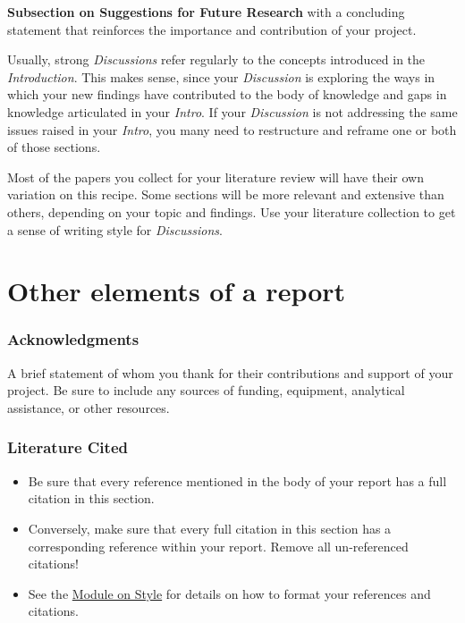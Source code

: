 \documentclass[
]{book}
\begin{document}
\textbf{Subsection on Suggestions for Future Research} with a concluding statement that reinforces the importance and contribution of your project.

Usually, strong \emph{Discussions} refer regularly to the concepts introduced in the \emph{Introduction}. This makes sense, since your \emph{Discussion} is exploring the ways in which your new findings have contributed to the body of knowledge and gaps in knowledge articulated in your \emph{Intro}. If your \emph{Discussion} is not addressing the same issues raised in your \emph{Intro}, you many need to restructure and reframe one or both of those sections.

Most of the papers you collect for your literature review will have their own variation on this recipe. Some sections will be more relevant and extensive than others, depending on your topic and findings. Use your literature collection to get a sense of writing style for \emph{Discussions}.

\hypertarget{other-elements-of-a-report}{%
\section*{Other elements of a report}\label{other-elements-of-a-report}}

\hypertarget{acknowledgments}{%
\subsubsection*{Acknowledgments}\label{acknowledgments}}

A brief statement of whom you thank for their contributions and support of your project. Be sure to include any sources of funding, equipment, analytical assistance, or other resources.

\hypertarget{literature-cited}{%
\subsubsection*{Literature Cited}\label{literature-cited}}

\begin{itemize}
\item
  Be sure that every reference mentioned in the body of your report has a full citation in this section.
\item
  Conversely, make sure that every full citation in this section has a corresponding reference within your report. Remove all un-referenced citations!
\item
  See the \protect\hyperlink{style}{Module on Style} for details on how to format your references and citations.
\end{itemize}
\end{document}

